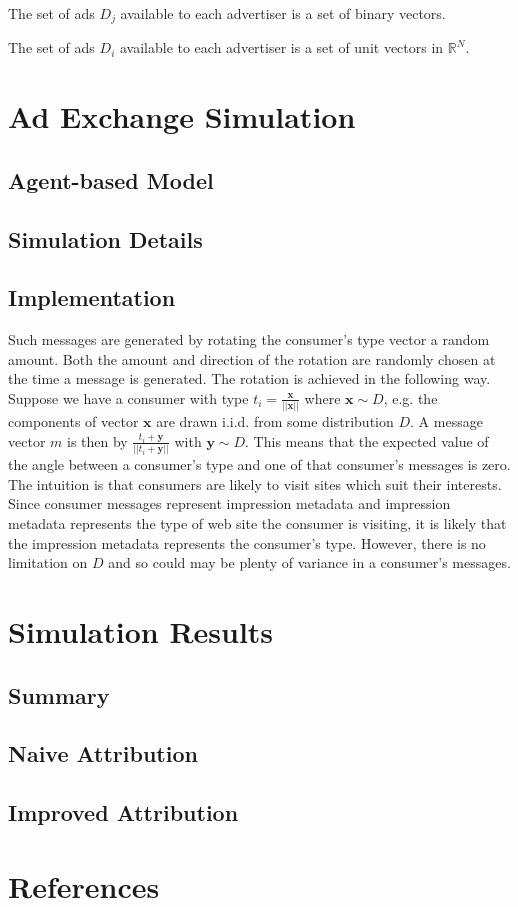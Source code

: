 \documentclass{article}
\begin{document}
The set of ads $D_j$ available to each advertiser is a set of binary vectors.

The set of ads $D_i$ available to each advertiser is a set of unit vectors in $\mathbb{R}^N$. 

\newpage

\section{Ad Exchange Simulation}

\subsection{Agent-based Model}

\subsection{Simulation Details}

\subsection{Implementation}

Such messages are generated by rotating the consumer's type vector a random amount. Both the amount and direction of the rotation are randomly chosen at the time a message is generated. The rotation is achieved in the following way. Suppose we have a consumer with type $t_i = \frac{\bm{x}}{||\bm{x}||}$ where $\bm{x} \sim D$, e.g. the components of vector $\bm{x}$ are drawn i.i.d. from some distribution $D$. A message vector $m$ is then by $\frac{t_i + \bm{y}}{||t_i + \bm{y}||}$ with $\bm{y} \sim D$. This means that the expected value of the angle between a consumer's type and one of that consumer's messages is zero. The intuition is that consumers are likely to visit sites which suit their interests. Since consumer messages represent impression metadata and impression metadata represents the type of web site the consumer is visiting, it is likely that the impression metadata represents the consumer's type. However, there is no limitation on $D$ and so could may be plenty of variance in a consumer's messages.

\newpage

\section{Simulation Results}

\subsection{Summary}

\subsection{Naive Attribution}

\subsection{Improved Attribution}

\section{References}



\end{document}
